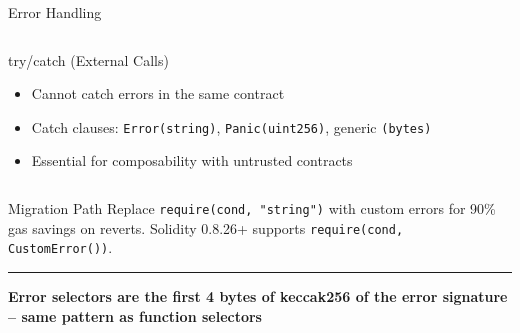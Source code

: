 \documentclass[8pt,aspectratio=169]{beamer}
\newcommand{\bottomnote}[1]{\vfill\vspace{-2mm}\textcolor{mllavender2}{\rule{\textwidth}{0.4pt}}\vspace{1mm}\footnotesize\textbf{#1}}
\begin{document}
\begin{frame}{Error Handling}
\begin{columns}
\begin{block}{try/catch (External Calls)}
\begin{itemize}
  \item Cannot catch errors in the same contract
  \item Catch clauses: \texttt{Error(string)}, \texttt{Panic(uint256)}, generic \texttt{(bytes)}
  \item Essential for composability with untrusted contracts
\end{itemize}
\end{block}
\end{columns}
\vspace{1mm}
\begin{alertblock}{Migration Path}
\small Replace \texttt{require(cond, "string")} with custom errors for 90\% gas savings on reverts. Solidity 0.8.26+ supports \texttt{require(cond, CustomError())}.
\end{alertblock}
\bottomnote{Error selectors are the first 4 bytes of keccak256 of the error signature -- same pattern as function selectors}
\end{frame}
\end{document}
